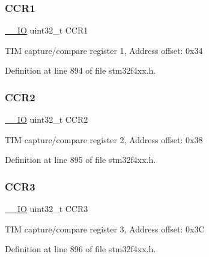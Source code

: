 \subsubsection{\texorpdfstring{C\+C\+R1}{CCR1}}
{\footnotesize\ttfamily \hyperlink{group___c_m_s_i_s__core__definitions_gaec43007d9998a0a0e01faede4133d6be}{\+\_\+\+\_\+\+IO} uint32\+\_\+t C\+C\+R1}

T\+IM capture/compare register 1, Address offset\+: 0x34 

Definition at line 894 of file stm32f4xx.\+h.

\mbox{\label{struct_t_i_m___type_def_ab90aa584f07eeeac364a67f5e05faa93}} 
\subsubsection{\texorpdfstring{C\+C\+R2}{CCR2}}
{\footnotesize\ttfamily \hyperlink{group___c_m_s_i_s__core__definitions_gaec43007d9998a0a0e01faede4133d6be}{\+\_\+\+\_\+\+IO} uint32\+\_\+t C\+C\+R2}

T\+IM capture/compare register 2, Address offset\+: 0x38 

Definition at line 895 of file stm32f4xx.\+h.

\mbox{\label{struct_t_i_m___type_def_a27a478cc47a3dff478555ccb985b06a2}} 
\subsubsection{\texorpdfstring{C\+C\+R3}{CCR3}}
{\footnotesize\ttfamily \hyperlink{group___c_m_s_i_s__core__definitions_gaec43007d9998a0a0e01faede4133d6be}{\+\_\+\+\_\+\+IO} uint32\+\_\+t C\+C\+R3}

T\+IM capture/compare register 3, Address offset\+: 0x3C 

Definition at line 896 of file stm32f4xx.\+h.

\mbox{\label{struct_t_i_m___type_def_a85fdb75569bd7ea26fa48544786535be}} 
